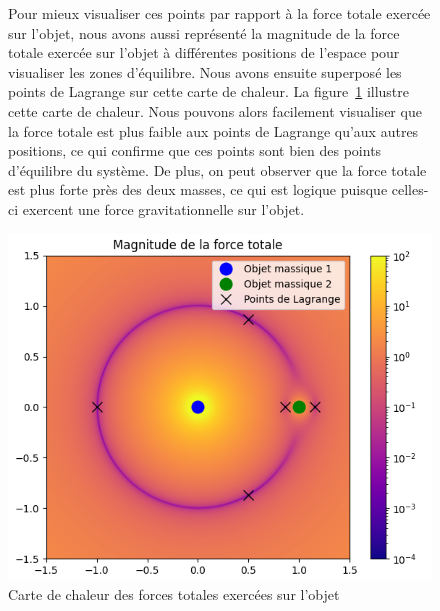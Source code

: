 \documentclass{article}
\begin{document}
\begin{figure}[H]
  \centering
  \begin{minipage}{0.5\textwidth}
  Pour mieux visualiser ces points par rapport à la force totale exercée sur l'objet, nous avons aussi représenté la magnitude de la force totale exercée sur l'objet à différentes positions de l'espace pour visualiser les zones d'équilibre. Nous avons ensuite superposé les points de Lagrange sur cette carte de chaleur. La figure~\ref{fig:lagrange-heat} illustre cette carte de chaleur. Nous pouvons alors facilement visualiser que la force totale est plus faible aux points de Lagrange qu'aux autres positions, ce qui confirme que ces points sont bien des points d'équilibre du système. De plus, on peut observer que la force totale est plus forte près des deux masses, ce qui est logique puisque celles-ci exercent une force gravitationnelle sur l'objet.
  \end{minipage}
  \hfill
  \begin{minipage}{0.45\textwidth}
  \includegraphics[width=\textwidth]{magnitude.png}
  \caption{Carte de chaleur des forces totales exercées sur l'objet}
  \label{fig:lagrange-heat}
  \end{minipage}%
\end{figure}
\end{document}
